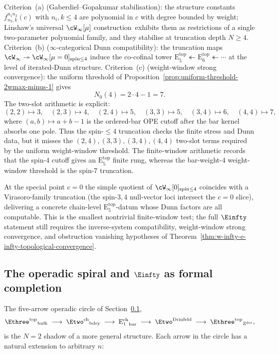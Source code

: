 \begin{example}
Criterion~\textup{(a)} (Gaberdiel--Gopakumar stabilisation): the
structure constants $f^{n_1 n_2}_{n_3, k}(c)$ with $n_i, k \le 4$ are
polynomial in $c$ with degree bounded by weight; Linshaw's universal
$\cW_\infty[\mu]$ construction\,\cite{Linshaw-Winfty-universal} exhibits
them as restrictions of a single two-parameter polynomial family, and
they stabilise at truncation depth $N \ge 4$. Criterion~\textup{(b)}
($\infty$-categorical Dunn compatibility): the truncation maps $\cW_\infty
\twoheadrightarrow \cW_\infty[\mu=0]_{\mathrm{spin}\le 4}$ induce the
co-cofinal tower
$\mathrm{E}_5^{\mathrm{top}} \twoheadleftarrow
\mathrm{E}_6^{\mathrm{top}} \twoheadleftarrow \cdots$
at the level of iterated-Dunn structure. Criterion~\textup{(c)}
(weight-window strong convergence): the uniform threshold of
Proposition~\ref{prop:uniform-threshold-2wmax-minus-1} gives
\[
 N_0(4) = 2\cdot 4 - 1 = 7.
\]
The two-slot arithmetic is explicit:
\[
 (2,2)\mapsto 3,\quad (2,3)\mapsto 4,\quad (2,4)\mapsto 5,\quad
 (3,3)\mapsto 5,\quad (3,4)\mapsto 6,\quad (4,4)\mapsto 7,
\]
where \((a,b)\mapsto a+b-1\) is the ordered-bar OPE cutoff after the
bar kernel absorbs one pole. Thus the spin-$\le 4$ truncation checks
the finite stress and Dunn data, but it misses the
\((2,4),(3,3),(3,4),(4,4)\) two-slot terms required by the uniform
weight-window threshold.
The finite-window arithmetic records that the spin-$4$ cutoff gives an
$\mathrm{E}_5^{\mathrm{top}}$ finite rung,
whereas the bar-weight-$4$ weight-window threshold is the spin-$7$
truncation.

At the special point $c = 0$ the simple quotient of
$\cW_\infty[0]_{\mathrm{spin}\le 4}$ coincides with a Virasoro-family
truncation (the spin-$3,4$ null-vector loci intersect the $c = 0$
slice), delivering a concrete chain-level
$\mathrm{E}_5^{\mathrm{top}}$-datum whose Dunn factors are all
computable. This is the smallest nontrivial finite-window test; the
full $\Einfty$ statement still requires the inverse-system
compatibility, weight-window strong convergence, and obstruction
vanishing hypotheses of
Theorem~\ref{thm:w-infty-e-infty-topological-convergence}.
\end{example}

\subsection{The operadic spiral and \texorpdfstring{$\Einfty$}{E\_infty}
as formal completion}
\label{subsec:operadic-spiral}

The five-arrow operadic circle of
Section~\ref{subsec:operadic-spiral},
\begin{equation}\label{eq:operadic-circle-recall}
{\Ethree^{\mathrm{top}}}_{\mathrm{bulk}}
\;\longrightarrow\; {\Etwo^{\mathrm{ch}}}_{\mathrm{bdry}}
\;\longrightarrow\; {\mathrm{E}_1^{\mathrm{ch}}}_{\mathrm{bar}}
\;\longrightarrow\; \Etwo^{\mathrm{Drinfeld}}
\;\longrightarrow\; {\Ethree^{\mathrm{top}}}_{\mathrm{Z}^{\mathrm{der}}},
\end{equation}
is the $N = 2$ shadow of a more general structure. Each arrow in the
circle has a natural extension to arbitrary $n$:

